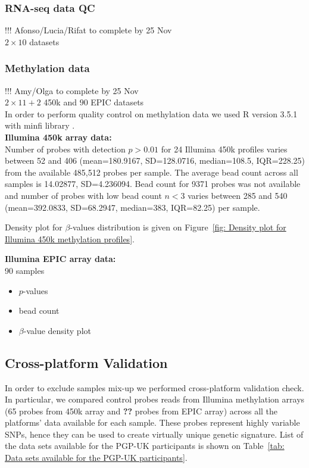 \documentclass[english]{article}
\begin{document}
\subsubsection*{RNA-seq data QC}
\colorbox{BurntOrange}{!!! Afonso/Lucia/Rifat to complete by 25 Nov}\\
$2\times10$ datasets

\subsubsection*{Methylation data}
\colorbox{BurntOrange}{!!! Amy/Olga to complete by 25 Nov}\\
$2\times11 + 2$ 450k  and $90$ EPIC datasets
\\
In order to perform quality control on methylation data we used R version 3.5.1 with minfi library \cite{minfi}.\\
\textbf{Illumina 450k array data:}\\
Number of probes with detection $p>0.01$ for 24 Illumina 450k profiles varies between 52 and 406 (mean=180.9167, SD=128.0716, median=108.5, IQR=228.25) from the available 485,512 probes per sample.
The average bead count across all samples is 14.02877, SD=4.236094. Bead count for 9371 probes was not available and number of probes with low bead count $n<3$ varies between 285 and 540 (mean=392.0833, SD=68.2947, median=383, IQR=82.25) per sample.

Density plot for $\beta$-values distribution is given on Figure~\ref{fig: Density plot for Illumina 450k methylation profiles}.

\textbf{Illumina EPIC array data:}\\
90 samples
\begin{itemize}
    \item $p$-values
    \item bead count
    \item $\beta$-value density plot 
\end{itemize}

\subsection*{Cross-platform Validation}
In order to exclude samples mix-up we performed cross-platform validation check. In particular, we compared control probes reads from Illumina methylation arrays (65 probes from 450k array and \textbf{??} probes from EPIC array) across all the platforms' data available for each sample. These probes represent highly variable SNPs, hence they can be used to create virtually unique genetic signature. List of the data sets available for the PGP-UK participants is shown on Table~\ref{tab: Data sets available for the PGP-UK participants}.
\end{document}

